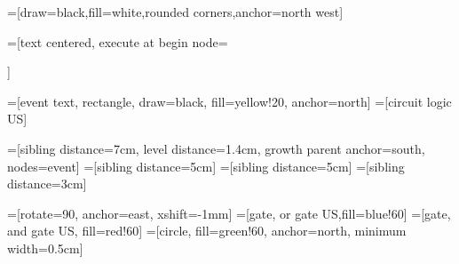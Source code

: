\DeclareMathOperator{\doo}{d}
\DeclareMathOperator{\nibefore}{\lhd}
\DeclareMathOperator{\simultaneous}{\triangle}
\DeclareMathOperator{\ibefore}{\unlhd}
\DeclareMathOperator{\inter}{\cap}
\DeclareMathOperator{\union}{\cup}
\DeclareMathOperator{\tvar}{\mathsf{tvar}}
\DeclareMathOperator{\distinct}{\mathsf{distinct}}
\DeclareMathOperator{\set}{\mathsf{set}}
\DeclareMathOperator{\xbefore}{\rightarrow}
\DeclareMathOperator{\listt}{\mathsf{list}}
\DeclareMathOperator{\sett}{\mathsf{set}}
\DeclareMathOperator{\tformulat}{\mathsf{tformula}}
\DeclareMathOperator{\BasicEventMinLevel}{\mathsf{BasicEventMinLevel}}
\DeclareMathOperator{\RootProbability}{\mathsf{RootProbability}}
\DeclareMathOperator{\evaluateRule}{\mathsf{evaluateRule}}
\DeclareMathOperator{\minBasicEventLevel}{\mathsf{minBasicEventLevel}}
\DeclareMathOperator{\ftProbability}{\mathsf{ftProbability}}
\DeclareMathOperator{\defs}{\doteq}
\newcommand{\aaexp}[2]{{\left[#1\right]}^{\left[#2\right]}}
\newcommand{\nominalvalue}[2]{\mathsf{N}^{#2}\left(#1\right)}
\newcommand{\failurevalue}[2]{\mathsf{#1}^{#2}}
\newcommand{\component}[1]{\mathsf{C}^{#1}}
\newcommand{\outvalue}[2]{\mathsf{#1}^{#2}}
\newcommand{\outvalueof}[1]{\rho\left(#1\right)}
\def\fba{fba}
\def\tfa{tfa}

\newcommand{\includeautosizegraphics}[1]{%
\texttt{[image: \#1]}%
}

\def\tikzoverlay{%
   \tikz[baseline,overlay]\node[every overlay node]
}

=[draw=black,fill=white,rounded corners,anchor=north west]

=[text centered, 
  execute at begin node={\begin{varwidth}{2cm}},
  execute at end node={\end{varwidth}}
  ]
  
=[event text, rectangle, draw=black, fill=yellow!20, anchor=north]
=[circuit logic US]

=[sibling distance=7cm, level distance=1.4cm, growth parent anchor=south, nodes=event]
=[sibling distance=5cm]
=[sibling distance=5cm]
=[sibling distance=3cm]

=[rotate=90, anchor=east, xshift=-1mm]
=[gate, or gate US,fill=blue!60]
=[gate, and gate US, fill=red!60]
=[circle, fill=green!60, anchor=north, minimum width=0.5cm]

